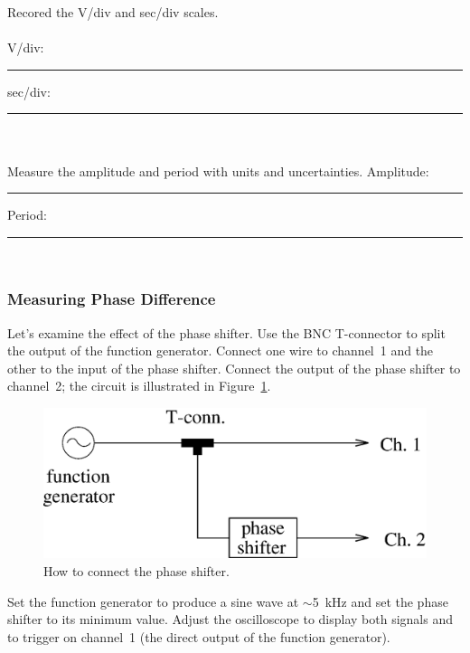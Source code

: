 \noindent Recored the V/div and sec/div scales.\\
\\
V/div:  \rule{3cm}{.1mm} \hspace*{1cm} sec/div: \rule{3cm}{.1mm}\\
\\
Measure the amplitude and period with units and uncertainties.
\vfill
Amplitude:  \rule{3cm}{.1mm} \hspace*{1cm} Period: \rule{3cm}{.1mm}\\
\pagebreak
\subsubsection{Measuring Phase Difference}
\label{sec:scope:measphdiff}

Let's examine the effect of the phase shifter. Use the BNC T-connector to 
split the output of the function generator. Connect one wire to channel~1 and
the other to the input of the phase shifter.  Connect the output of the phase
shifter to channel~2; the circuit is illustrated in 
Figure~\ref{fig:scope:phasemeas}.
\begin{figure}[htb]
\centering \epsfxsize=8cm \includegraphics[scale=0.7]{4_oscilloscope/phasemeas.eps}
\caption{How to connect the phase shifter.}
\label{fig:scope:phasemeas}
\end{figure}
Set the function generator to produce a sine wave at $\sim$5~kHz and set the
phase shifter to its minimum value. Adjust the oscilloscope to display both 
signals and to trigger on channel~1 (the direct output of the function 
generator). \\

